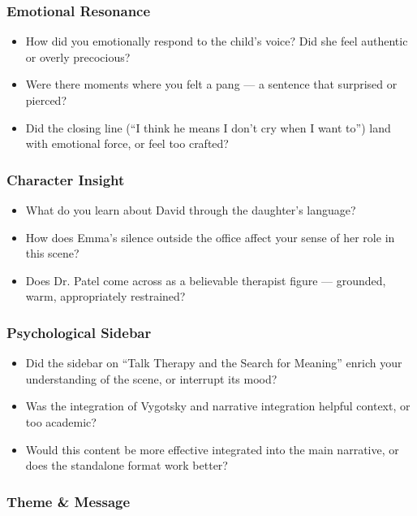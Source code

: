 \subsubsection*{Emotional Resonance}

\begin{itemize}
  \item How did you emotionally respond to the child’s voice? Did she feel authentic or overly precocious?
  \item Were there moments where you felt a pang — a sentence that surprised or pierced?
  \item Did the closing line (“I think he means I don’t cry when I want to”) land with emotional force, or feel too crafted?
\end{itemize}

\subsubsection*{Character Insight}

\begin{itemize}
  \item What do you learn about David through the daughter’s language?
  \item How does Emma’s silence outside the office affect your sense of her role in this scene?
  \item Does Dr. Patel come across as a believable therapist figure — grounded, warm, appropriately restrained?
\end{itemize}

\subsubsection*{Psychological Sidebar}

\begin{itemize}
  \item Did the sidebar on ``Talk Therapy and the Search for Meaning'' enrich your understanding of the scene, or interrupt its mood?
  \item Was the integration of Vygotsky and narrative integration helpful context, or too academic?
  \item Would this content be more effective integrated into the main narrative, or does the standalone format work better?
\end{itemize}

\subsubsection*{Theme \& Message}

